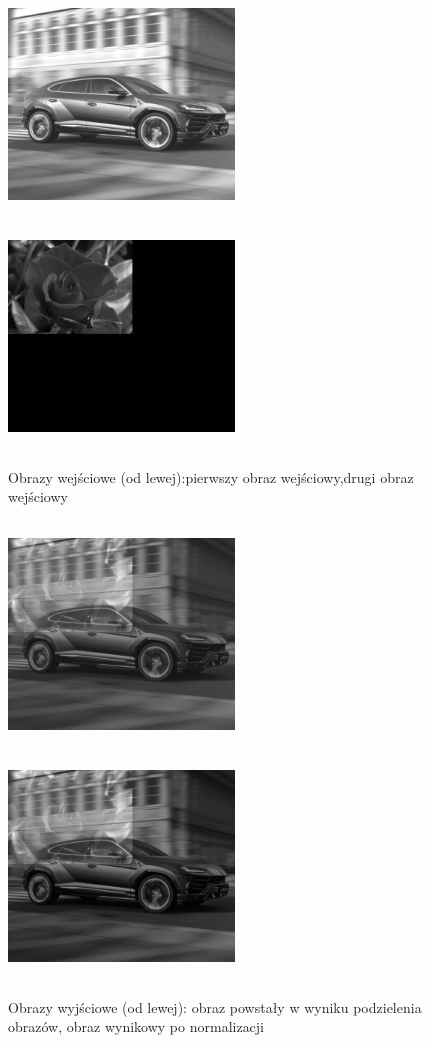 \documentclass[magisterska,openany]{pracadypl}
\begin{document}
\newpage
\begin{figure}[h]
\centering
\includegraphics[width=6cm, height=6cm]{2_2/ResolG3.jpg}
\includegraphics[width=6cm, height=6cm]{2_2/ResolG4.jpg}
\caption{Obrazy wejściowe (od lewej):pierwszy obraz wejściowy,drugi obraz wejściowy}
\end{figure}
\begin{figure}[h]
\centering
\includegraphics[width=6cm, height=6cm]{3_8/div_twoG2.jpg}
\includegraphics[width=6cm, height=6cm]{3_8/ndiv_twoG2.jpg}
\caption{Obrazy wyjściowe (od lewej): obraz powstały w wyniku
podzielenia obrazów, obraz wynikowy po normalizacji}
\end{figure}
\end{document}
